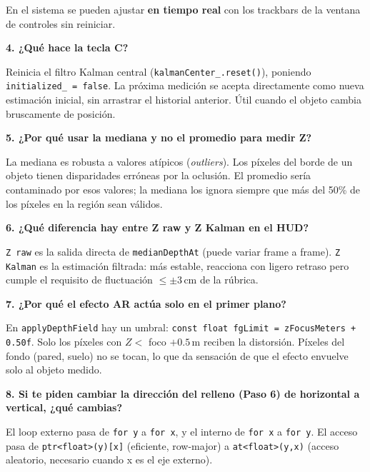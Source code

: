 \documentclass[11pt,a4paper]{article}
\begin{document}
En el sistema se pueden ajustar \textbf{en tiempo real} con los trackbars de la ventana de controles sin reiniciar.

\vspace{6pt}
\textbf{4. ¿Qué hace la tecla C?}

Reinicia el filtro Kalman central (\texttt{kalmanCenter\_.reset()}), poniendo
\texttt{initialized\_ = false}. La próxima medición se acepta directamente como
nueva estimación inicial, sin arrastrar el historial anterior.
Útil cuando el objeto cambia bruscamente de posición.

\vspace{6pt}
\textbf{5. ¿Por qué usar la mediana y no el promedio para medir Z?}

La mediana es robusta a valores atípicos (\textit{outliers}).
Los píxeles del borde de un objeto tienen disparidades erróneas por la oclusión.
El promedio sería contaminado por esos valores; la mediana los ignora
siempre que más del 50\% de los píxeles en la región sean válidos.

\vspace{6pt}
\textbf{6. ¿Qué diferencia hay entre Z raw y Z Kalman en el HUD?}

\texttt{Z raw} es la salida directa de \texttt{medianDepthAt} (puede variar frame a frame).
\texttt{Z Kalman} es la estimación filtrada: más estable, reacciona con ligero retraso
pero cumple el requisito de fluctuación $\leq \pm 3\,\text{cm}$ de la rúbrica.

\vspace{6pt}
\textbf{7. ¿Por qué el efecto AR actúa solo en el primer plano?}

En \texttt{applyDepthField} hay un umbral: \texttt{const float fgLimit = zFocusMeters + 0.50f}.
Solo los píxeles con $Z <$ foco $+0.5\,\text{m}$ reciben la distorsión.
Píxeles del fondo (pared, suelo) no se tocan, lo que da sensación de que el efecto
envuelve solo al objeto medido.

\vspace{6pt}
\textbf{8. Si te piden cambiar la dirección del relleno (Paso 6) de horizontal a vertical, ¿qué cambias?}

El loop externo pasa de \texttt{for y} a \texttt{for x}, y el interno de \texttt{for x} a \texttt{for y}.
El acceso pasa de \texttt{ptr<float>(y)[x]} (eficiente, row-major) a \texttt{at<float>(y,x)}
(acceso aleatorio, necesario cuando x es el eje externo).

\end{document}
